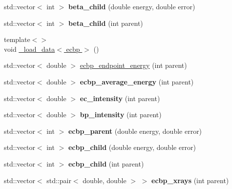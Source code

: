 \begin{DoxyCompactItemize}
\item 
\mbox{\label{namespacepyne_a06a66d50d789c15eb06403145c9e8f78}} 
std\+::vector$<$ int $>$ {\bfseries beta\+\_\+child} (double energy, double error)
\item 
\mbox{\label{namespacepyne_aecf3b1f9104cd326141aaabf6dc1dd85}} 
std\+::vector$<$ int $>$ {\bfseries beta\+\_\+child} (int parent)
\item 
{\footnotesize template$<$$>$ }\\void \hyperlink{namespacepyne_aa0e5344b00be282952a8da5cc928b387}{\+\_\+load\+\_\+data$<$ ecbp $>$} ()
\item 
std\+::vector$<$ double $>$ \hyperlink{namespacepyne_a01290076b747cd8f6fb8785d698d9319}{ecbp\+\_\+endpoint\+\_\+energy} (int parent)
\item 
\mbox{\label{namespacepyne_aae965f50671162fd430ecc100a6734c3}} 
std\+::vector$<$ double $>$ {\bfseries ecbp\+\_\+average\+\_\+energy} (int parent)
\item 
\mbox{\label{namespacepyne_acdd99da92f821b3634d41c217f7ba36c}} 
std\+::vector$<$ double $>$ {\bfseries ec\+\_\+intensity} (int parent)
\item 
\mbox{\label{namespacepyne_ae90f342a67b82fd077368de131ad511f}} 
std\+::vector$<$ double $>$ {\bfseries bp\+\_\+intensity} (int parent)
\item 
\mbox{\label{namespacepyne_a02be9a4983e3e83032e61aa37477b10f}} 
std\+::vector$<$ int $>$ {\bfseries ecbp\+\_\+parent} (double energy, double error)
\item 
\mbox{\label{namespacepyne_ac59bf74785aa6b188506174de3b2ce53}} 
std\+::vector$<$ int $>$ {\bfseries ecbp\+\_\+child} (double energy, double error)
\item 
\mbox{\label{namespacepyne_a2262ce3daa576a7bd988583ee2e9cbca}} 
std\+::vector$<$ int $>$ {\bfseries ecbp\+\_\+child} (int parent)
\item 
\mbox{\label{namespacepyne_a2534b5faa411582a7b6829c9bd54224d}} 
std\+::vector$<$ std\+::pair$<$ double, double $>$ $>$ {\bfseries ecbp\+\_\+xrays} (int parent)
\end{DoxyCompactItemize}


